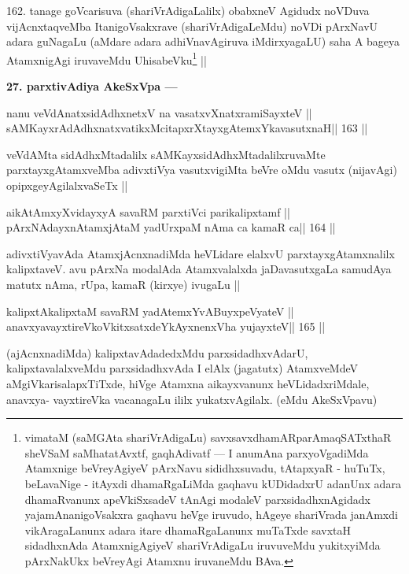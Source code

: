 \begin{artha}
162. tanage goVcarisuva (shariVrAdigaLalilx) obabxneV Agidudx noVDuva 
vijAcnxtaqveMba ItanigoVsakxrave (shariVrAdigaLeMdu) noVDi pArxNavU adara guNagaLu (aMdare adara adhiVnavAgiruva iMdirxyagaLU) saha A bageya AtamxnigAgi iruvaveMdu UhisabeVku\footnote[9]{vimataM (saMGAta shariVrAdigaLu) savxsavxdhamARparAmaqSATxthaR sheVSaM saMhatatAvxtf, gaqhAdivatf --- I anumAna parxyoVgadiMda Atamxnige beVreyAgiyeV pArxNavu sididhxsuvadu, tAtapxyaR - huTuTx, beLavaNige - itAyxdi dhamaRgaLiMda gaqhavu kUDidadxrU adanUnx adara dhamaRvanunx apeVkiSxsadeV tAnAgi modaleV parxsidadhxnAgidadx yajamAnanigoVsakxra gaqhavu heVge iruvudo, hAgeye shariVrada janAmxdi vikAragaLanunx adara itare dhamaRgaLanunx muTaTxde savxtaH sidadhxnAda AtamxnigAgiyeV shariVrAdigaLu iruvuveMdu yukitxyiMda pArxNakUkx beVreyAgi Atamxnu iruvaneMdu BAva.} ||
\end{artha}

\begin{artha}
{\bf 27. parxtivAdiya AkeSxVpa ---}
\end{artha}

\begin{shl}
nanu veVdAnatxsidAdhxnetxV na vasatxvXnatxramiSayxteV ||
sAMKayxrAdAdhxnatxvatikxMcitapxrXtayxgAtemxYkavasutxnaH\hfill || 163 ||
\end{shl}

\begin{artha}
veVdAMta sidAdhxMtadalilx sAMKayxsidAdhxMtadalilxruvaMte 
parxtayxgAtamxveMba adivxtiVya vasutxvigiMta beVre oMdu vasutx (nijavAgi) opipxgeyAgilalxvaSeTx ||
\end{artha}

\begin{shl}
aikAtAmxyXvidayxyA savaRM parxtiVci parikalipxtamf ||
pArxNAdayxnAtamxjAtaM yadUrxpaM nAma ca kamaR ca\hfill || 164 ||
\end{shl}

\begin{artha}
adivxtiVyavAda AtamxjAcnxnadiMda heVLidare elalxvU parxtayxgAtamxnalilx 
kalipxtaveV. avu pArxNa modalAda Atamxvalalxda jaDavasutxgaLa samudAya matutx nAma, rUpa, kamaR (kirxye) ivugaLu ||
\end{artha}

\begin{shl}
kalipxtAkalipxtaM savaRM yadA\s\s temxYvABuyxpeVyateV ||
anavxyavayxtireVkoVkitxsatxdeYkAyxnenxVha yujayxteV\hfill || 165 ||
\end{shl}

\begin{artha}
(ajAcnxnadiMda) kalipxtavAdadedxMdu parxsidadhxvAdarU, 
kalipxtavalalxveMdu parxsidadhxvAda I elAlx (jagatutx) AtamxveMdeV aMgiVkarisalapxTiTxde, hiVge Atamxna aikayxvanunx heVLidadxriMdale, anavxya- vayxtireVka vacanagaLu ililx yukatxvAgilalx. (eMdu AkeSxVpavu)
\end{artha}

